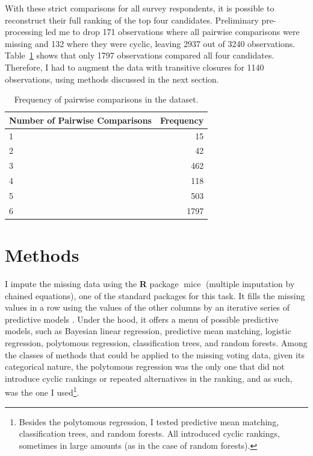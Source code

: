 \documentclass[hidelinks,11pt]{article} \usepackage[utf8]{inputenc}
\begin{document}
With these strict comparisons for all survey respondents, it is possible to reconstruct their full ranking of the top four candidates. Preliminary pre-processing led me to drop 171 observations where all pairwise comparisons were missing and 132 where they were cyclic, leaving 2937 out of 3240 observations. Table~\ref{Tab:Tcpairwise} shows that only 1797 observations compared all four candidates. Therefore, I had to augment the data with transitive closures for 1140 observations, using methods discussed in the next section.


\begin{table}[!h]\centering
\begin{tabular}{lr}
\hline
Number of Pairwise Comparisons & Frequency \\ \hline
1                              & 15        \\
2                              & 42        \\
3                              & 462       \\
4                              & 118       \\
5                              & 503       \\
6                              & 1797      \\ \hline
\end{tabular}


\caption{Frequency of pairwise comparisons in the dataset.}

\label{Tab:Tcpairwise}
\end{table}

\section{Methods}

I impute the missing data using the \textbf{\textsf{R}} package \(\operatorname{mice}\) (multiple imputation by chained equations), one of the standard packages for this task. It fills the missing values in a row using the values of the other columns by an iterative series of predictive models \parencite{vanbuuren2018imputation}. Under the hood, it offers a menu of possible predictive models, such as Bayesian linear regression, predictive mean matching, logistic regression, polytomous regression, classification trees, and random forests. Among the classes of methods that could be applied to the missing voting data, given its categorical nature, the polytomous regression was the only one that did not introduce cyclic rankings or repeated alternatives in the ranking, and as such, was the one I used\footnote{Besides the polytomous
regression, I tested predictive mean matching, classification trees, and random
forests. All introduced cyclic rankings, sometimes in large amounts (as in the
case of random forests).}.
\end{document}

